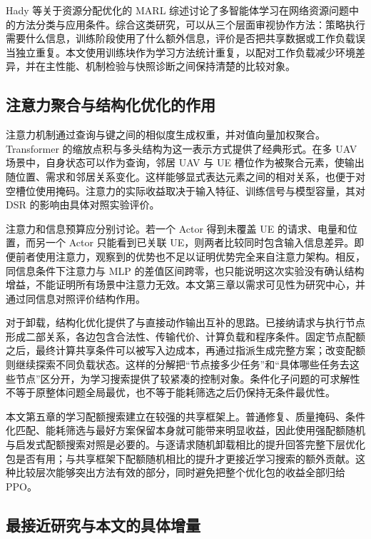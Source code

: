 Hady 等关于资源分配优化的 MARL 综述讨论了多智能体学习在网络资源问题中的方法分类与应用条件\cite{fan2021uav}。综合这类研究，可以从三个层面审视协作方法：策略执行需要什么信息，训练阶段使用了什么额外信息，评价是否把共享数据或工作负载误当独立重复。本文使用训练块作为学习方法统计重复，以配对工作负载减少环境差异，并在主性能、机制检验与快照诊断之间保持清楚的比较对象。

\subsection{注意力聚合与结构化优化的作用}
\label{sec:ch1-attention-related}

注意力机制通过查询与键之间的相似度生成权重，并对值向量加权聚合。Transformer 的缩放点积与多头结构为这一表示方式提供了经典形式\cite{vaswani2017attention}。在多 UAV 场景中，自身状态可以作为查询，邻居 UAV 与 UE 槽位作为被聚合元素，使输出随位置、需求和邻居关系变化。这样能够显式表达元素之间的相对关系，也便于对空槽位使用掩码。注意力的实际收益取决于输入特征、训练信号与模型容量，其对 DSR 的影响由具体对照实验评价。

注意力和信息预算应分别讨论。若一个 Actor 得到未覆盖 UE 的请求、电量和位置，而另一个 Actor 只能看到已关联 UE，则两者比较同时包含输入信息差异。即便前者使用注意力，观察到的优势也不足以证明优势完全来自注意力架构。相反，同信息条件下注意力与 MLP 的差值区间跨零，也只能说明这次实验没有确认结构增益，不能证明所有场景中注意力无效。本文第三章以需求可见性为研究中心，并通过同信息对照评价结构作用。

对于卸载，结构化优化提供了与直接动作输出互补的思路。已接纳请求与执行节点形成二部关系，各边包含合法性、传输代价、计算负载和程序条件。固定节点配额之后，最终计算共享条件可以被写入边成本，再通过指派生成完整方案；改变配额则继续探索不同负载状态。这样的分解把“节点接多少任务”和“具体哪些任务去这些节点”区分开，为学习搜索提供了较紧凑的控制对象。条件化子问题的可求解性不等于原整体问题全局最优，也不等于能耗筛选之后仍保持无条件最优性。

本文第五章的学习配额搜索建立在较强的共享框架上。普通修复、质量掩码、条件化匹配、能耗筛选与最好方案保留本身就可能带来明显收益，因此使用强配额随机与启发式配额搜索对照是必要的。与逐请求随机卸载相比的提升回答完整下层优化包是否有用；与共享框架下配额随机相比的提升才更接近学习搜索的额外贡献。这种比较层次能够突出方法有效的部分，同时避免把整个优化包的收益全部归给 PPO。

\subsection{最接近研究与本文的具体增量}
\label{sec:ch1-closest-work}


